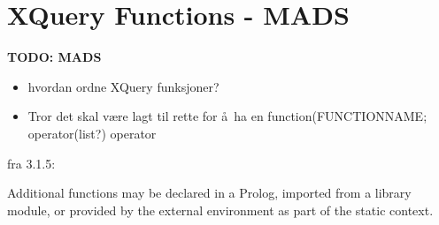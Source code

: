 \section{XQuery Functions - {MADS}}
\label{sect:disc:functions}
\textbf{\LARGE TODO: {MADS}}
\begin{itemize}
  \item hvordan ordne XQuery funksjoner?
  \item Tror det skal v\ae re lagt til rette for \aa~ha en \textsf{function(FUNCTIONNAME; operator(list?)} operator
  \end{itemize}
  
fra 3.1.5:
\begin{quoute}
  Additional functions may be declared in a Prolog, imported from a library module, or provided by the external
  environment as part of the static context.
  \end{quoute}
